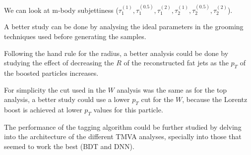 \documentclass[main]{subfiles} %
\begin{document}


\doublespacing

\vspace{20pt}

We can look at m-body subjettiness ($\tau_1^{(1)},\tau_1^{(0.5)},\tau_1^{(2)},\tau_2^{(1)},\tau_2^{(0.5)},\tau_2^{(2)}$).

A better study can be done by analysing the ideal parameters in the grooming techniques used before generating the samples. 

Following the hand rule for the radius, a better analysis could be done by studying the effect of decreasing the $R$ of the reconstructed fat jets as the $p_T$ of the boosted particles increases.

For simplicity the cut used in the $W$ analysis was the same as for the top analysis, a better study could use a lower $p_T$ cut for the $W$, because the Lorentz boost is achieved at lower $p_T$ values for this particle.

The performance of the tagging algorithm could be further studied by delving into the architecture of the different TMVA analyses, specially into those that seemed to work the best (BDT and DNN).




















\biblio
\end{document}

